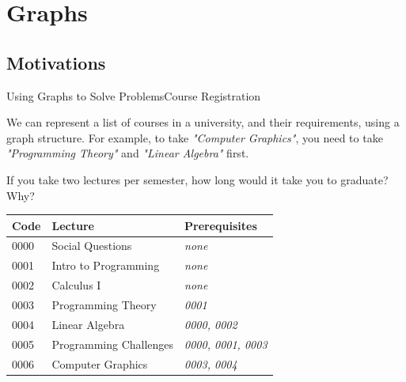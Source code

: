 \section{Graphs}


\subsection{Motivations}

\begin{frame}{Using Graphs to Solve Problems}{Course Registration}

  We can represent a list of courses in a university, and their requirements, using a graph structure. For example, to take \emph{"Computer Graphics"}, you need to take \emph{"Programming Theory"} and \emph{"Linear Algebra"} first.\medskip

  If you take two lectures per semester, how long would it take you to graduate? Why?

  \begin{tabular}{p{}|p{}||p{}}
    \hline
    Code & Lecture & Prerequisites \\
    \hline
    0000 & {\small Social Questions} & \emph{none} \\
    0001 & {\small Intro to Programming} & \emph{none} \\
    0002 & {\small Calculus I} & \emph{none} \\
    0003 & {\small Programming Theory} & \emph{0001} \\
    0004 & {\small Linear Algebra} & \emph{0000, 0002} \\
    0005 & {\small Programming Challenges} & \emph{0000, 0001, 0003} \\
    0006 & {\small Computer Graphics} & \emph{0003, 0004} \\
    \hline
  \end{tabular}
\end{frame}


